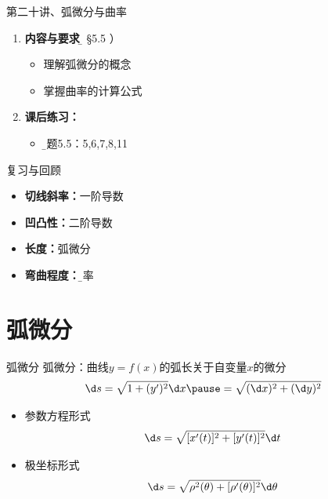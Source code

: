 \begin{frame}{第二十讲、弧微分与曲率}
	\linespread{1.5}
	\begin{enumerate}
	  \item {\bf 内容与要求}{\b（ \S 5.5 ）}
	  \begin{itemize}
	    \item 理解弧微分的概念
	    \item 掌握曲率的计算公式
	  \vspace{1em}
	  \end{itemize}
	  \item {\bf 课后练习：}
	  \begin{itemize}
	    \item {\b 习题5.5：5,6,7,8,11}
	  \end{itemize}
	\end{enumerate}
\end{frame}

\begin{frame}{复习与回顾}
	\linespread{1.5}
% 	
	
	\begin{itemize}
	  \item {\bf 切线斜率：}一阶导数\pause
	  \item {\bf 凹凸性：}二阶导数\pause
	  \item {\bf 长度：}弧微分\pause
	  \item {\bf 弯曲程度：}{\b 曲率}
	\end{itemize}
\end{frame}

\section{弧微分}

\begin{frame}{弧微分}\pause 
	\linespread{1.2}
	{\bb 弧微分：}曲线$y=f(x)$的弧长关于自变量$x$的微分\pause 
	$$\d s=\sqrt{1+(y')^2}\d x\pause =\sqrt{(\d x)^2+(\d y)^2}$$\pause 
	\vspace{-1em}
	\begin{itemize}
	  \item 参数方程形式\pause 
	  $$\d s=\sqrt{[x'(t)]^2+[y'(t)]^2}\d t$$\pause 
	  \vspace{-3ex}
	  \item 极坐标形式\pause 
	  $$\d s=\sqrt{\rho^2(\theta)+[\rho'(\theta)]^2}\d\theta$$
	\end{itemize}
\end{frame}

